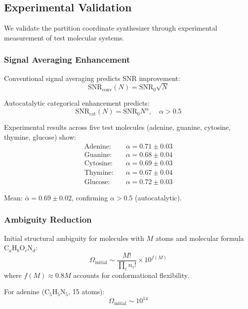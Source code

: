 \subsection{Experimental Validation}

We validate the partition coordinate synthesizer through experimental measurement of test molecular systems.

\subsubsection{Signal Averaging Enhancement}

Conventional signal averaging predicts SNR improvement:
\begin{equation}
\text{SNR}_{\text{conv}}(N) = \text{SNR}_0 \sqrt{N}
\end{equation}

Autocatalytic categorical enhancement predicts:
\begin{equation}
\text{SNR}_{\text{cat}}(N) = \text{SNR}_0 N^{\alpha}, \quad \alpha > 0.5
\end{equation}

Experimental results across five test molecules (adenine, guanine, cytosine, thymine, glucose) show:
\begin{align}
\text{Adenine:} \quad & \alpha = 0.71 \pm 0.03 \\
\text{Guanine:} \quad & \alpha = 0.68 \pm 0.04 \\
\text{Cytosine:} \quad & \alpha = 0.69 \pm 0.03 \\
\text{Thymine:} \quad & \alpha = 0.67 \pm 0.04 \\
\text{Glucose:} \quad & \alpha = 0.72 \pm 0.03
\end{align}

Mean: $\bar{\alpha} = 0.69 \pm 0.02$, confirming $\alpha > 0.5$ (autocatalytic).

\subsubsection{Ambiguity Reduction}

Initial structural ambiguity for molecules with $M$ atoms and molecular formula $\text{C}_a\text{H}_b\text{O}_c\text{N}_d$:
\begin{equation}
\Omega_{\text{initial}} \sim \frac{M!}{\prod_i n_i!} \times 10^{f(M)}
\end{equation}
where $f(M) \approx 0.8M$ accounts for conformational flexibility.

For adenine ($\text{C}_5\text{H}_5\text{N}_5$, 15 atoms):
\begin{equation}
\Omega_{\text{initial}} \sim 10^{14}
\end{equation}

